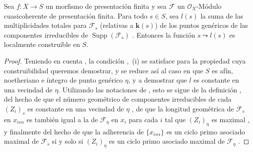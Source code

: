 \begin{proposition}[9.8.8]
\label{IV.9.8.8}
Sea $f:X\to S$ un morfismo de presentación finita y sea $\mathcal F$ un $\mathcal O_X$-Módulo cuasicoherente de presentación finita.
Para todo $s\in S$, sea $l(s)$ la suma de las multiplicidades totales para $\mathcal F_s$ (relativas a $\boldsymbol{k}(s)$) de los puntos genéricos de las componentes irreducibles de $\operatorname{Supp}(\mathcal F_s)$ .
Entonces la función $s\leadsto l(s)$ es localmente construible en $S$.
\end{proposition}

\begin{proof}
\label{IV.9.8.8-proof}
Teniendo en cuenta , la condición ,~(i) se satisface para la propiedad cuya construibilidad queremos demostrar, y se reduce así al caso en que $S$ es afín, noetheriano e íntegro de punto genérico $\eta$, y a demostrar que $l$ es constante en una vecindad de $\eta$.
Utilizando las notaciones de , esto se sigue de la definición , del hecho de que el número geométrico de componentes irreducibles de cada $(Z_i)_s$ es constante en una vecindad de $\eta$ , de que la longitud geométrica de $\mathcal F_s$ en $x_{is\alpha}$ es también igual a la de $\mathcal F_\eta$ en $x_i$ para cada $i$ tal que $(Z_i)_\eta$ es maximal , y finalmente del hecho de que la adherencia de $\{x_{is\alpha}\}$ es un ciclo primo asociado maximal de $\mathcal F_s$ si y solo si $(Z_i)_\eta$ es un ciclo primo asociado maximal de $\mathcal F_\eta$ .
\end{proof}


